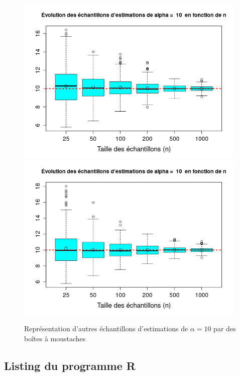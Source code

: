 \documentclass{article}
\begin{document}
\begin{figure}[!h]
\begin{center}
\includegraphics[width=11cm]{plot_box_1_a10}
\includegraphics[width=11cm]{plot_box_2_a10}
\caption{Représentation d'autres échantillons d'estimations de $\alpha=10$ par des boîtes à moustaches}
\end{center}
\end{figure}

\subsection{Listing du programme R}
\end{document}
